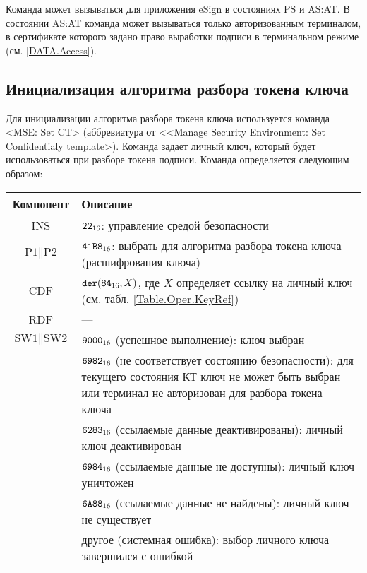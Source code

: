 Команда может вызываться для приложения eSign в 
состояниях PS и AS:AT. В состоянии AS:AT команда 
может вызываться только авторизованным терминалом,
в сертификате которого задано право 
выработки подписи в терминальном режиме 
(см. \ref{DATA.Access}).


\subsection{Инициализация алгоритма разбора токена ключа}
\label{Oper.Descr.SetCT}

Для инициализации алгоритма разбора токена ключа
используется команда <MSE: Set CT> (аббревиатура от <<Manage Security Environment: Set 
Confidentialy template>).
Команда задает личный ключ, 
который будет использоваться при разборе токена подписи.
Команда определяется следующим образом:

\noindent
\begin{tabular}{|c|p{14cm}|}
\hline
Компонент & Описание \\
\hline
\hline
INS & $\texttt{22}_{16}$: управление средой безопасности\\ 
\hline
$\text{P1} \parallel\text{P2}$ & $\texttt{41B8}_{16}$: 
выбрать для алгоритма разбора токена ключа
(расшифрования ключа) \\
\hline
CDF & 
$\texttt{der}(\texttt{84}_{16}, X)$, 
где $X$ определяет ссылку на личный ключ
(см. табл. \ref{Table.Oper.KeyRef})\\
\hline \hline
RDF &  --- \\
\hline
$\text{SW1} \parallel \text{SW2}$ & 
$\texttt{9000}_{16}$ (успешное выполнение): ключ выбран \\
 & $\texttt{6982}_{16}$ (не соответствует состоянию безопасности): 
для текущего состояния КТ ключ не может быть выбран или
терминал не авторизован для разбора токена ключа\\
 & $\texttt{6283}_{16}$ (ссылаемые данные деактивированы): личный ключ деактивирован\\
 & $\texttt{6984}_{16}$ (ссылаемые данные не доступны): личный ключ уничтожен\\
 & $\texttt{6A88}_{16}$ (ссылаемые данные не найдены): личный ключ не существует\\
 & другое (системная ошибка): выбор личного ключа завершился с ошибкой  \\
\hline
\end{tabular}

